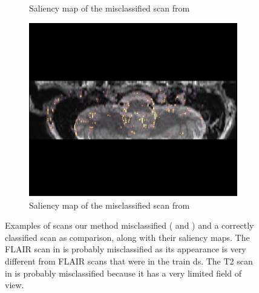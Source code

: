 \begin{figure}
\begin{subfigure}[t]{0.25\textwidth}
        \caption{Saliency map of the misclassified \gls{scan} from \protect{}}\label{fig:RIDER_FLAIR_saliency}
    \end{subfigure}
    \hfill
    \begin{subfigure}[t]{0.25\textwidth}
        \centering
        \includegraphics[width=\textwidth]{Figures/Appendix/Saliency_T2_hippo.pdf}
        \caption{Saliency map of the misclassified \gls{scan} from \protect{}}\label{fig:T2_hippo_saliency}
    \end{subfigure}

\caption{Examples of \glspl{scan} our method misclassified (\protect{} and \protect{}) and a correctly classified \gls{scan} \protect{} as comparison, along with their saliency maps.
The \gls{FLAIR} \gls{scan} in \protect{} is probably misclassified as its appearance is very different from \gls{FLAIR} \glspl{scan} that were in the train \gls{ds}.
The \gls{T2} \gls{scan} in \protect{} is probably misclassified because it has a very limited field of view.}
\label{fig:FLAIR_comparison}

\end{figure}

